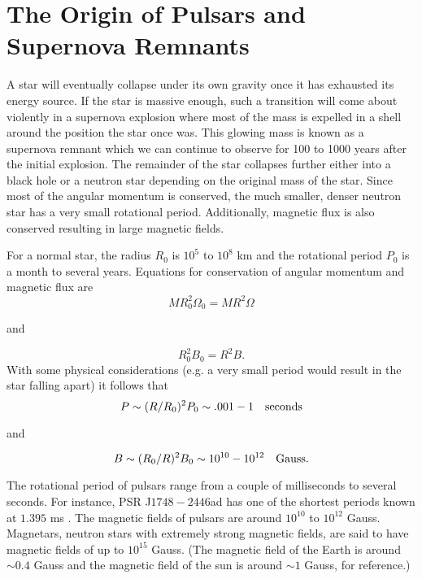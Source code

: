 \section{The Origin of Pulsars and Supernova Remnants}
\label{sec:originAndSNR}
A star will eventually collapse under its own gravity once it has exhausted its energy source.
If the star is massive enough, such a transition will come about violently in a
supernova explosion where most of the mass is expelled in a shell around the position
the star once was. This glowing mass is known as a supernova remnant which
we can continue to observe for 100 to 1000 years after the initial explosion.  The remainder of the
star collapses further either into a black hole or a neutron star depending on the
original mass of the star.  Since most of the angular momentum is conserved, the
much smaller, denser neutron star has a very small rotational period.
Additionally, magnetic flux is also conserved resulting in large magnetic fields.

For a normal star, the radius $R_0$ is $10^5$ to $10^8$ km and
the rotational period $P_0$ is a month to several years.
Equations for conservation of angular momentum and magnetic flux are
\begin{equation}
M R^2_0 \Omega_0=M R^2 \Omega
\end{equation}
\begin{center}
and
\end{center}
\begin{equation}
R^2_0 B_0 = R^2 B.
\end{equation}
With some physical considerations
(e.g. a very small period would result
in the star falling apart) it follows that
\begin{equation}
P \sim (R/R_0)^2 P_0 \sim .001 - 1 \quad \rm{seconds}\\\\
\end{equation}
\begin{center}
and
\end{center}
\begin{equation}
B \sim (R_0/R)^2 B_0 \sim 10^{10}-10^{12} \quad \rm{Gauss}.
\end{equation}

The rotational period of pulsars range from a couple of milliseconds to
several seconds.  For instance, PSR J$1748-2446$ad has one of the shortest
 periods known at $1.395$ ms \citep{hessels2006radio}.
The magnetic fields of pulsars are around $10^{10}$ to $10^{12}$ Gauss.
Magnetars, neutron stars with extremely strong magnetic fields, are said to have
magnetic fields of up to $10^{15}$ Gauss.  (The magnetic field of the Earth is
around $\sim 0.4$ Gauss and the magnetic field of the sun is around $\sim 1$ Gauss, for reference.)


